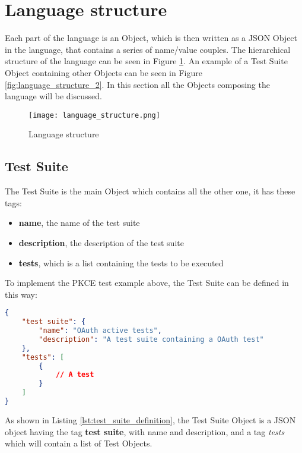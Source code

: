 \section{Language structure}
Each part of the language is an Object, which is then written as a JSON Object in the language, that contains a series of name/value couples. The hierarchical structure of the language can be seen in Figure \ref{fig:language_structure}. An example of a Test Suite Object containing other Objects can be seen in Figure \ref{fig:language_structure_2}. In this section all the Objects composing the language will be discussed.

\begin{figure}
    \texttt{[image: language\_structure.png]}
    \caption{Language structure}
    \label{fig:language_structure}
\end{figure}

\subsection{Test Suite}
The Test Suite is the main Object which contains all the other one, it has these tags:

\begin{itemize}
    \item \textbf{name}, the name of the test suite
    \item \textbf{description}, the description of the test suite
    \item \textbf{tests}, which is a list containing the tests to be executed
\end{itemize}
To implement the \gls{PKCE} test example above, the Test Suite can be defined in this way:

\begin{lstlisting}[language=json, caption=Test Suite definition, label={lst:test_suite_definition}]
{
    "test suite": {
        "name": "OAuth active tests",
        "description": "A test suite containing a OAuth test"
    },
    "tests": [
        {
            // A test
        }
    ]
}
\end{lstlisting}

As shown in Listing \ref{lst:test_suite_definition}, the Test Suite Object is a JSON object having the tag \textbf{test suite}, with name and description, and a tag \textit{tests} which will contain a list of Test Objects.

